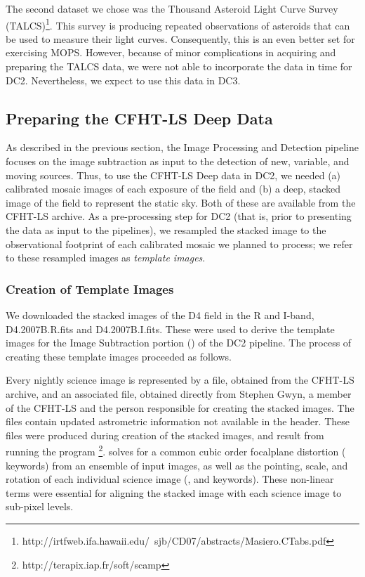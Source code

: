 The second dataset we chose was the Thousand Asteroid Light Curve
Survey 
(TALCS)\footnote{http://irtfweb.ifa.hawaii.edu/~sjb/CD07/abstracts/Masiero.CTabs.pdf}. 
This survey is producing repeated observations
of asteroids that can be used to measure their light curves.
Consequently, this is an even better set for exercising MOPS.
However, because of minor complications in acquiring and preparing the
TALCS data, we were not able to incorporate the data in time for DC2.
Nevertheless, we expect to use this data in DC3.  

\subsection{Preparing the CFHT-LS Deep Data}\label{tInDat-prep}

As described in the previous section, the Image Processing and Detection pipeline
focuses on the image subtraction as input to the detection of new,
variable, and moving sources.  Thus, to use the CFHT-LS Deep data in
DC2, we needed (a) calibrated mosaic images of each exposure of
the field and (b) a deep, stacked image of the field to
represent the static sky.  Both of these are available from the
CFHT-LS archive.  As a pre-processing step for DC2 (that is, prior to
presenting the data as input to the pipelines), we resampled the
stacked image to the observational footprint of each calibrated mosaic
we planned to process; we refer to these resampled images as
\textit{template images}.  

\subsubsection{Creation of Template Images}\label{sInDat-t}

We downloaded the stacked images of the D4 field in the R and
I-band, D4.2007B.R.fits and D4.2007B.I.fits.  These were used to
derive the template images for the Image Subtraction portion
() of the DC2 pipeline.  The process of
creating these template images proceeded as follows.

Every nightly science image is represented by a  file,
obtained from the CFHT-LS archive, and an associated 
file, obtained directly from Stephen Gwyn, a member of the CFHT-LS and
the person responsible for creating the stacked images.  The
 files contain updated astrometric information not
available in the  header.  These  files were
produced during creation of the stacked images, and result from
running the program
\footnote{http://terapix.iap.fr/soft/scamp}.  
solves for a common cubic order focalplane distortion (
keywords) from an ensemble of input images, as well as the pointing,
scale, and rotation of each individual science image (,
 and  keywords).  These non-linear terms
were essential for aligning the stacked image with each science image
to sub-pixel levels.

